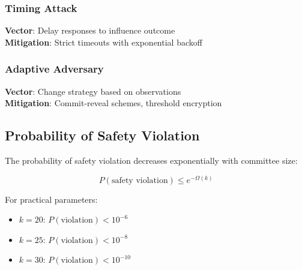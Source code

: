 \subsubsection{Timing Attack}
\textbf{Vector}: Delay responses to influence outcome\\
\textbf{Mitigation}: Strict timeouts with exponential backoff

\subsubsection{Adaptive Adversary}
\textbf{Vector}: Change strategy based on observations\\
\textbf{Mitigation}: Commit-reveal schemes, threshold encryption

\subsection{Probability of Safety Violation}

The probability of safety violation decreases exponentially with committee size:

\begin{equation}
P(\text{safety violation}) \leq e^{-\Omega(k)}
\label{eq:safety}
\end{equation}

For practical parameters:
\begin{itemize}
\item $k = 20$: $P(\text{violation}) < 10^{-6}$
\item $k = 25$: $P(\text{violation}) < 10^{-8}$
\item $k = 30$: $P(\text{violation}) < 10^{-10}$
\end{itemize}

